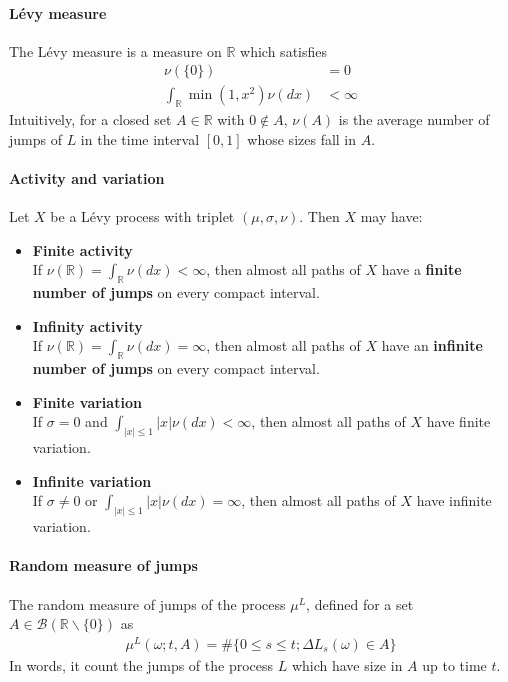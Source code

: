 \documentclass[a4paper,landscape,7pt,fleqn]{scrartcl}
\renewcommand{\emph}[1]{\textbf{#1}}
\begin{document}
\begin{multicols*}{3}
\paragraph{Lévy measure}
The Lévy measure is a measure on $\mathbb{R}$ which satisfies
\begin{align*}
\nu(\lbrace 0 \rbrace ) &= 0 \\
\int_\mathbb{R} \min(1,x^2) \nu(dx) &< \infty
\end{align*}
Intuitively, for a closed set $A \in \mathbb{R}$ with $0 \notin A$, $\nu(A)$ is the average number of jumps of $L$ in the time interval $[0,1]$ whose sizes fall in $A$.

\paragraph{Activity and variation}
Let $X$ be a Lévy process with triplet $(\mu, \sigma, \nu)$. Then $X$ may have:
\begin{itemize}
\item  \emph{Finite activity} \\
If $\nu(\mathbb{R}) = \int_\mathbb{R} \nu(dx) < \infty$, then almost all paths of $X$ have a \emph{finite number of jumps} on every compact interval.
\item \emph{Infinity activity} \\
If $\nu(\mathbb{R}) = \int_\mathbb{R} \nu(dx) = \infty$, then almost all paths of $X$ have an \emph{infinite number of jumps} on every compact interval.
\item \emph{Finite variation} \\
If $\sigma = 0$ and $\int_{|x| \leq 1} |x| \nu(dx) < \infty$, then almost all paths of $X$ have finite variation.
\item \emph{Infinite variation} \\
If $\sigma \neq 0$ or $\int_{|x| \leq 1} |x| \nu(dx) = \infty$, then almost all paths of $X$ have infinite variation.
\end{itemize}

\paragraph{Random measure of jumps}
The random measure of jumps of the process $\mu^L$, defined for a set $A \in \mathcal{B}(\mathbb{R} \backslash \lbrace 0 \rbrace )$ as
\begin{align*}
\mu^L(\omega; t, A) = \# \lbrace 0 \leq s \leq t; \Delta L_s(\omega) \in A \rbrace
\end{align*}
In words, it count the jumps of the process $L$ which have size in $A$ up to time $t$.


\end{multicols*}
\end{document}
